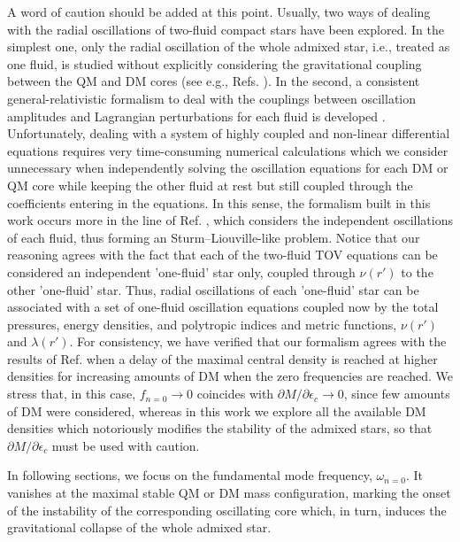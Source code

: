\documentclass[universe,article,accept,moreauthors,pdftex]{Definitions/mdpi}
\begin{document}
A word of caution should be added at this point. Usually, two ways of dealing with the radial oscillations of two-fluid compact stars have been explored. In the simplest one, only the radial oscillation of the whole admixed star, i.e., treated as one fluid, is studied without explicitly considering  the gravitational coupling between the QM and DM cores (see e.g., Refs. \cite{Tolos:2015qra,Panotopoulos:2017eig,Panotopoulos:2018ipq}). In the second, a consistent general-relativistic formalism to deal with the couplings between oscillation amplitudes and Lagrangian perturbations for each fluid is developed \cite{Kain:2020zjs,Kain:2021hpk}. Unfortunately, dealing with a system of highly coupled and non-linear differential equations requires very time-consuming numerical calculations which we consider unnecessary when independently solving  the oscillation equations for each DM or QM core while keeping the other fluid at rest but still coupled through the coefficients entering in the equations. In this sense, the formalism built in this work occurs more in the line of Ref. \cite{Leung:2012vea}, which considers the independent oscillations of each fluid, thus forming an Sturm--Liouville-like problem. Notice that our reasoning agrees with the fact that each of the two-fluid TOV equations can be considered an independent 'one-fluid' star only, coupled through $\nu(r')$ to the other 'one-fluid' star. Thus, radial oscillations of each 'one-fluid' star can be associated with a set of one-fluid oscillation equations coupled now by the total pressures, energy densities, and polytropic indices and metric functions, $\nu(r')$ and $\lambda(r')$. For consistency, we have verified that our formalism agrees with the results of Ref. \cite{Mukhopadhyay:2015xhs} when a delay of the maximal central density is reached at higher densities for increasing amounts of DM when the zero frequencies are reached. We stress that, in this case, $f_{n=0}\to{0}$ coincides with $\partial{M}/\partial\epsilon_{c}\to{0}$, since few amounts of DM were considered, whereas in this work we explore all the available DM densities which  notoriously modifies the stability of the admixed stars, so that $\partial{M}/\partial\epsilon_{c}$ must be used with caution.

In following sections, we focus on the fundamental mode frequency, $\omega_{n=0}$. It vanishes at the maximal stable QM or DM mass configuration, marking the onset of the instability of the corresponding oscillating core which, in turn, induces the gravitational collapse of the whole admixed star.
\end{document}
